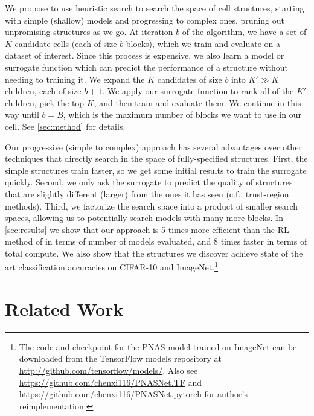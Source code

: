 \documentclass[runningheads]{llncs}
\begin{document}
We propose to use  heuristic search to search the space of cell structures,
starting with simple (shallow) models and progressing to complex ones, pruning out unpromising structures as we go.
At iteration $b$ of the algorithm, we have a set of $K$ candidate cells (each of size $b$ blocks), which we train and evaluate on a dataset of interest. Since this process is expensive,
we also learn a model or surrogate function which can predict the performance of a structure
without needing to training it.
We expand the $K$ candidates of size $b$ into $K' \gg K$ children, each of size $b+1$.
We apply our surrogate function to rank all of the $K'$ children,
pick the top $K$, and then train and evaluate them.
We continue in this way until $b=B$, which is the maximum number of blocks we want to use in our cell.
See \cref{sec:method} for details.

Our progressive (simple to complex) approach has several advantages over other techniques that directly search in the space of fully-specified structures. First, the simple structures train faster, so we get some initial results to train the surrogate quickly. Second, we only ask the surrogate to predict the quality of structures that are slightly different
(larger) from the ones it has seen
(c.f., trust-region methods). 
Third, we factorize the search space into a product of smaller search spaces, 
allowing us to potentially search models with many more blocks.
In \cref{sec:results} we show that our approach 
is 5 times more efficient than the RL method of \cite{DBLP:journals/corr/ZophVSL17} in terms of number of models evaluated, and 8 times faster in terms of total compute.
We also show that the structures we discover achieve state of the art classification accuracies on CIFAR-10 and ImageNet.\footnote{The code and checkpoint for the PNAS model trained on ImageNet can be downloaded from the TensorFlow models repository at \url{http://github.com/tensorflow/models/}. Also see \url{https://github.com/chenxi116/PNASNet.TF} and \url{https://github.com/chenxi116/PNASNet.pytorch} for author's reimplementation.}

\section{Related Work}\label{sec:related}
\end{document}
